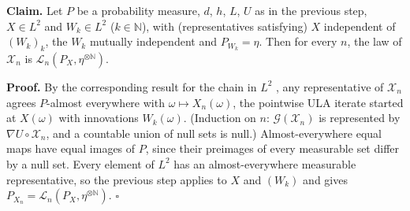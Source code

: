 \documentclass[11pt,a4paper]{article}
\begin{document}
\textbf{Claim.} Let \(P\) be a probability measure, \(d\), \(h\), \(L\), \(U\) as in the previous step, \(X\in L^2\) and \(W_k\in L^2\) (\(k\in\mathbb N\)), with (representatives satisfying) \(X\) independent of \((W_k)_k\), the \(W_k\) mutually independent and \(P_{W_k}=\eta\). Then for every \(n\), the law of \(\mathcal X_n\) is \(\mathcal L_n(P_X,\eta^{\otimes\mathbb N})\).




\textbf{Proof.} By the corresponding result for the chain in \(L^2\) \cite[Section~3.13.16]{LangevinLean2026ULASC}, any representative of \(\mathcal X_n\) agrees \(P\)-almost everywhere with \(\omega\mapsto X_n(\omega)\), the pointwise ULA iterate started at \(X(\omega)\) with innovations \(W_k(\omega)\). (Induction on \(n\): \(\mathcal G(\mathcal X_n)\) is represented by \(\nabla U\circ\mathcal X_n\), and a countable union of null sets is null.) Almost-everywhere equal maps have equal images of \(P\), since their preimages of every measurable set differ by a null set. Every element of \(L^2\) has an almost-everywhere measurable representative, so the previous step applies to \(X\) and \((W_k)\) and gives \(P_{X_n}=\mathcal L_n(P_X,\eta^{\otimes\mathbb N})\). \(\square\)
\end{document}
